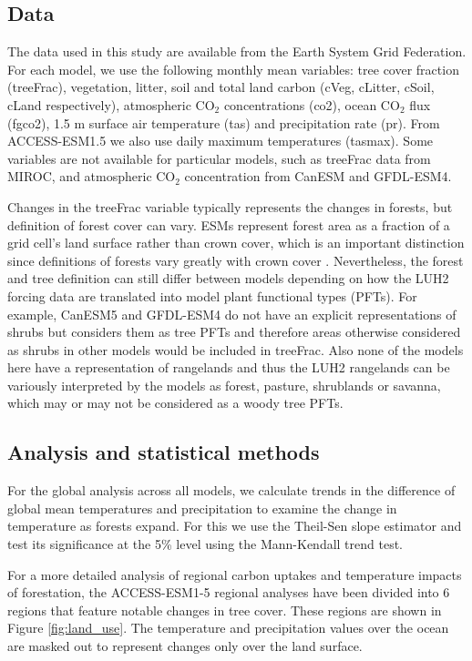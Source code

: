 \documentclass[]{article}
\begin{document}
\subsection{Data}

The data used in this study are available from the Earth System Grid Federation.
For each model, we use the following monthly mean variables: tree cover fraction (treeFrac), vegetation, litter, soil and total land carbon (cVeg, cLitter, cSoil, cLand respectively), atmospheric CO$_2$ concentrations (co2), ocean CO$_2$ flux (fgco2), 1.5 m surface air temperature (tas) and precipitation rate (pr).
From ACCESS-ESM1.5 we also use daily maximum temperatures (tasmax).
Some variables are not available for particular models, such as treeFrac data from MIROC, and atmospheric CO$_2$ concentration from CanESM and GFDL-ESM4.

Changes in the treeFrac variable typically represents the changes in forests, but definition of forest cover can vary.
ESMs represent forest area as a fraction of a grid cell's land surface rather than crown cover, which is an important distinction since definitions of forests vary greatly with crown cover \parencite{zomer_land_2008}.
Nevertheless, the forest and tree definition can still differ between models depending on how the LUH2 forcing data are translated into model plant functional types (PFTs).
For example, CanESM5 and GFDL-ESM4 do not have an explicit representations of shrubs but considers them as tree PFTs and therefore areas otherwise considered as shrubs in other models would be included in treeFrac.
Also none of the models here have a representation of rangelands and thus the LUH2 rangelands can be variously interpreted by the models as forest, pasture, shrublands or savanna, which may or may not be considered as a woody tree PFTs.

\subsection{Analysis and statistical methods}

For the global analysis across all models, we calculate trends in the difference of global mean temperatures and precipitation to examine the change in temperature as forests expand.
For this we use the Theil-Sen slope estimator and test its significance at the 5\% level using the Mann-Kendall trend test.

For a more detailed analysis of regional carbon uptakes and temperature impacts of forestation, the ACCESS-ESM1-5 regional analyses have been divided into 6 regions that feature notable changes in tree cover.
These regions are shown in Figure \ref{fig:land_use}.
The temperature and precipitation values over the ocean are masked out to represent changes only over the land surface.
\end{document}
